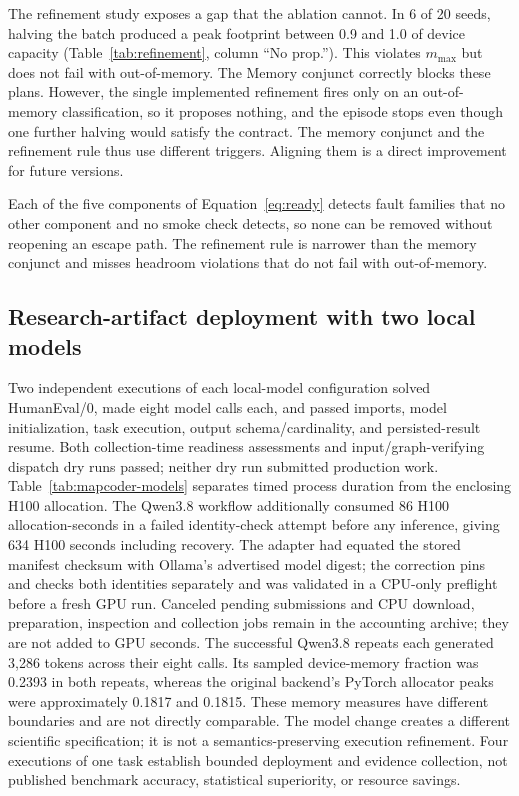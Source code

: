 \documentclass[pdflatex,sn-mathphys-num]{sn-jnl}
\theoremstyle{thmstylethree}
\newcommand{\HeadroomGapSeeds}{6}
\begin{document}
The refinement study exposes a gap that the ablation cannot. In \HeadroomGapSeeds{} of 20 seeds, halving the batch produced a peak footprint between 0.9 and 1.0 of device capacity (Table~\ref{tab:refinement}, column ``No prop.''). This violates $m_{\max}$ but does not fail with out-of-memory. The Memory conjunct correctly blocks these plans. However, the single implemented refinement fires only on an out-of-memory classification, so it proposes nothing, and the episode stops even though one further halving would satisfy the contract. The memory conjunct and the refinement rule thus use different triggers. Aligning them is a direct improvement for future versions.

\begin{tcolorbox}[rqbox, title={Answer to RQ4}]
Each of the five components of Equation~\eqref{eq:ready} detects fault families that no other component and no smoke check detects, so none can be removed without reopening an escape path. The refinement rule is narrower than the memory conjunct and misses headroom violations that do not fail with out-of-memory.
\end{tcolorbox}


\subsection{Research-artifact deployment with two local models}\label{sec:mapcoder-deployment}

Two independent executions of each local-model configuration solved HumanEval/0, made eight model calls each, and passed imports, model initialization, task execution, output schema/cardinality, and persisted-result resume. Both collection-time readiness assessments and input/graph-verifying dispatch dry runs passed; neither dry run submitted production work. Table~\ref{tab:mapcoder-models} separates timed process duration from the enclosing H100 allocation. The Qwen3.8 workflow additionally consumed 86 H100 allocation-seconds in a failed identity-check attempt before any inference, giving 634 H100 seconds including recovery. The adapter had equated the stored manifest checksum with Ollama's advertised model digest; the correction pins and checks both identities separately and was validated in a CPU-only preflight before a fresh GPU run. Canceled pending submissions and CPU download, preparation, inspection and collection jobs remain in the accounting archive; they are not added to GPU seconds. The successful Qwen3.8 repeats each generated 3,286 tokens across their eight calls. Its sampled device-memory fraction was 0.2393 in both repeats, whereas the original backend's PyTorch allocator peaks were approximately 0.1817 and 0.1815. These memory measures have different boundaries and are not directly comparable. The model change creates a different scientific specification; it is not a semantics-preserving execution refinement. Four executions of one task establish bounded deployment and evidence collection, not published benchmark accuracy, statistical superiority, or resource savings.
\end{document}

